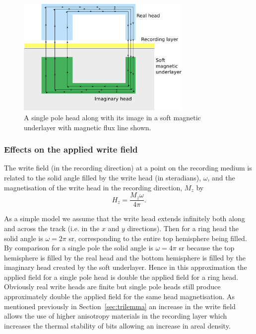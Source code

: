 \begin{figure}[!ht]
  \center
  \includegraphics[width=0.75\textwidth]{./images/SPH_images}
  \caption{A single pole head along with its image in a soft magnetic underlayer
    with magnetic flux line shown.\label{fig:imaginary_head}}
\end{figure}


\subsubsection{Effects on the applied write field}

The write field (in the recording direction) at a point on the recording medium
is related to the solid angle filled by the write head (in steradians),
$\omega$, and the magnetisation of the write head in the recording direction,
$M_{z}$ by\cite{Richter2007a}
\[ H_{z}=\dfrac{M_{z} \omega}{4\pi}.\]

As a simple model we assume that the write head extends infinitely both along
and across the track (i.e. in the $x$ and $y$ directions). Then for a ring head
the solid angle is $\omega=2\pi$ sr, corresponding to the entire top hemisphere
being filled. By comparison for a single pole the solid angle is $\omega=4\pi$
sr because the top hemisphere is filled by the real head and the bottom
hemisphere is filled by the imaginary head created by the soft underlayer. Hence
in this approximation the applied field for a single pole head is double the
applied field for a ring head. Obviously real write heads are finite but single
pole heads still produce approximately double the applied field for the same
head magnetisation.\cite{Khizroev2004a} As mentioned previously in
Section~\ref{sec:trilemma} an increase in the write field allows the use of
higher anisotropy materials in the recording layer which increases the thermal
stability of bits allowing an increase in areal density.


